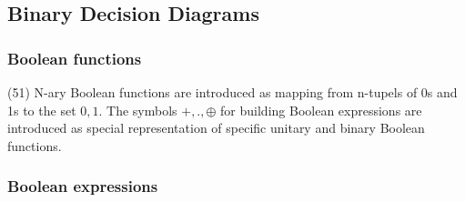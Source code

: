 %
%
%
%
%

\subsection{Binary Decision Diagrams}

\subsubsection{Boolean functions}
\label{tut:51}

(51) N-ary Boolean functions are introduced as mapping from n-tupels of 0s and 1s to the set ${0,1}$.
The symbols $+,.,\oplus$ for building Boolean expressions are introduced as special representation of
specific unitary and binary Boolean functions.

\subsubsection{Boolean expressions}
\label{tut:52}

